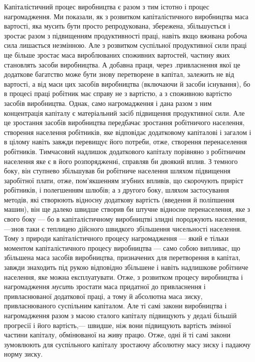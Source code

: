 \documentclass[12pt, a4paper, final]{memoir}
\begin{document}
Капіталістичний процес виробництва є разом з тим істотно і процес нагромадження. Ми показали, як з розвитком капіталістичного виробництва маса вартості, яка мусить бути просто репродукована, збережена, збільшується і зростає разом з підвищенням продуктивності праці, навіть якщо вживана робоча сила лишається незмінною. Але з розвитком суспільної продуктивної сили праці ще більше зростає маса вироблюваних споживних вартостей, частину яких становлять засоби виробництва. А добавна праця, через .привласнення якої це додаткове багатство може бути знову перетворене в капітал, залежить не від вартості, а від маси цих засобів виробництва (включаючи й засоби існування), бо в процесі праці робітник має справу не з вартістю, а з споживною вартістю засобів виробництва. Однак, само нагромадження і дана разом з ним концентрація капіталу є матеріальний засіб підвищення продуктивної сили. Але це зростання засобів виробництва передбачає зростання робітничого населення, створення населення робітників, яке відповідає додатковому капіталові і загалом і в цілому навіть завжди перевищує його потреби, отже, створення перенаселення робітників. Тимчасовий надлишок додаткового капіталу порівняно з робітничим населення яке є в його розпорядженні, справляв би двоякий вплив. З темного боку, він ступнево збільшував би робітниче населення шляхом підвищення заробітної плати, отже, пом’якшенням згубних впливів, що скорочують приріст робітників, і полегшенням шлюбів; а з другого боку, шляхом застосування методів, які створюють відносну додаткову вартість (введення й поліпшення машин), він ще далеко швидше створив би штучне відносне перенаселення, яке з свого боку — бо в капіталістичному виробництві злидні породжують населення,—знов таки є теплицею дійсного швидкого збільшення чисельності населення. Тому з природи капіталістичного процесу нагромадження — який е тільки моментом капіталістичного процесу виробництва — само собою випливає, що збільшена маса засобів виробництва, призначених для перетворення в капітал, завжди знаходить під рукою відповідно збільшене і навіть надлишкове робітниче населення, яке можна експлуатувати. Отже, з розвитком процесу виробництва і нагромадження \emph{мусить} зростати маса придатної до привласнення і привласнюваної додаткової праці, а тому й абсолютна маса зиску, привласнюваного суспільним капіталом. Але ті самі закони виробництва і нагромадження разом з масою сталого капіталу підвищують у дедалі більшій прогресії і його вартість,— швидше, ніж вони підвищують вартість змінної частини капіталу, обмінюваної на живу працю. Отже, одні й ті самі закони зумовлюють для суспільного капіталу зростаючу абсолютну масу зиску і падаючу норму зиску.
\end{document}
